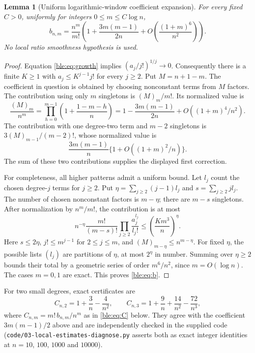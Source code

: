 \documentclass[11pt]{article}
\numberwithin{equation}{section}
\newtheorem{lemma}[theorem]{Lemma}
\theoremstyle{definition}
\theoremstyle{remark}
\begin{document}
\begin{lemma}[Uniform logarithmic-window coefficient expansion]\label{ble:lem:coef}
For every fixed $C>0$, uniformly for integers $0\le m\le C\log n$,
\begin{equation}\label{ble:eq:b}
 b_{n,m}=\frac{n^m}{m!}\left(1+\frac{3m(m-1)}{2n}
                    +O\!\left(\frac{(1+m)^6}{n^2}\right)\right).
\end{equation}
No local ratio smoothness hypothesis is used.
\end{lemma}
\begin{proof}
Equation \eqref{ble:eq:growth} implies $(a_j/j!)^{1/j}\to0$.
Consequently there is a finite $K\ge1$ with $a_j\le K^{j-1}j!$ for every
$j\ge2$.
Put $M=n+1-m$. The coefficient in question is obtained by choosing
nonconstant terms from $M$ factors. The contribution using only $m$
singletons is $(M)_m/m!$. Its normalized value is
\[
 \frac{(M)_m}{n^m}
 =\prod_{h=0}^{m-1}\left(1+\frac{1-m-h}{n}\right)
 =1-\frac{3m(m-1)}{2n}+O((1+m)^4/n^2).
\]
The contribution with one degree-two term and $m-2$ singletons is
$3(M)_{m-1}/(m-2)!$, whose normalized value is
\[
 \frac{3m(m-1)}n\{1+O((1+m)^2/n)\}.
\]
The sum of these two contributions supplies the displayed first
correction.

For completeness, all higher patterns admit a uniform bound. Let $l_j$
count the chosen degree-$j$ terms for $j\ge2$. Put
$\eta=\sum_{j\ge2}(j-1)l_j$ and $s=\sum_{j\ge2}jl_j$. The number of chosen
nonconstant factors is $m-\eta$; there are $m-s$ singletons. After
normalization by $n^m/m!$, the contribution is at most
\[
 n^{-\eta}\frac{m!}{(m-s)!}\prod_{j\ge2}\frac{a_j^{l_j}}{l_j!}
 \le \left(\frac{K m^3}{n}\right)^{\eta}.
\]
Here $s\le2\eta$, $j!\le m^{j-1}$ for $2\le j\le m$, and
$(M)_{m-\eta}\le n^{m-\eta}$. For fixed $\eta$, the possible lists $(l_j)$
are partitions of $\eta$, at most $2^\eta$ in number. Summing over
$\eta\ge2$ bounds their total by a geometric series of order $m^6/n^2$,
since $m=O(\log n)$. The cases $m=0,1$ are exact. This proves
\eqref{ble:eq:b}.
\end{proof}

For two small degrees, exact certificates are
\[
 C_{n,2}=1+\frac3n-\frac4{n^2},\qquad
 C_{n,3}=1+\frac9n+\frac{14}{n^2}-\frac{72}{n^3},
\]
where $C_{n,m}=m!\,b_{n,m}/n^m$ as in \eqref{ble:eq:C} below. They agree
with the coefficient $3m(m-1)/2$ above and are independently checked in
the supplied code (\nolinkurl{code/03-local-estimates-diagnose.py} asserts
both as exact integer identities at $n=10$, $100$, $1000$ and $10000$).
\end{document}
